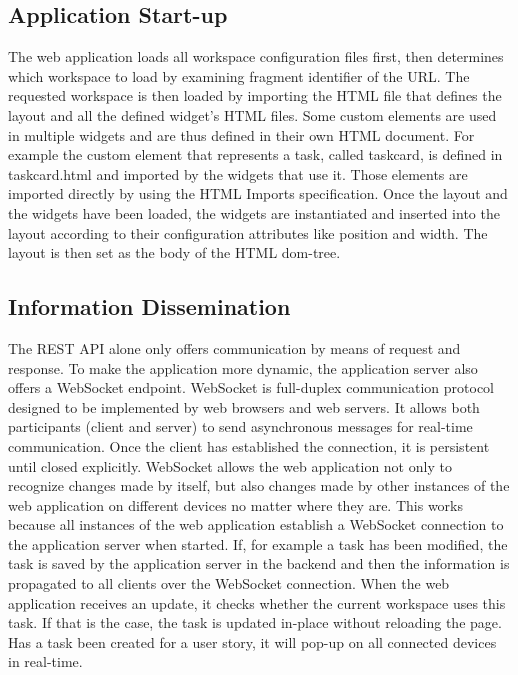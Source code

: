 \documentclass{sigchi}
\begin{document}
\subsection{Application Start-up}
The web application loads all workspace configuration files first, then determines which workspace to load by examining fragment identifier of the URL.
The requested workspace is then loaded by importing the HTML file that defines the layout and all the defined widget's HTML files.
Some custom elements are used in multiple widgets and are thus defined in their own HTML document.
For example the custom element that represents a task, called taskcard, is defined in taskcard.html and imported by the widgets that use it.
Those elements are imported directly by using the HTML Imports specification.
Once the layout and the widgets have been loaded, the widgets are instantiated and inserted into the layout according to their configuration attributes like position and width.
The layout is then set as the body of the HTML \gls{dom}-tree.

\subsection{Information Dissemination}
The REST API alone only offers communication by means of request and response.
To make the application more dynamic, the application server also offers a WebSocket \cite{websocketRFC} endpoint.
WebSocket is full-duplex communication protocol designed to be implemented by web browsers and web servers.
It allows both participants (client and server) to send asynchronous messages for real-time communication.
Once the client has established the connection, it is persistent until closed explicitly.
WebSocket allows the web application not only to recognize changes made by itself, but also changes made by other instances of the web application on different devices no matter where they are.
This works because all instances of the web application establish a WebSocket connection to the application server when started.
If, for example a task has been modified, the task is saved by the application server in the backend and then the information is propagated to all clients over the WebSocket connection.
When the web application receives an update, it checks whether the current workspace uses this task.
If that is the case, the task is updated in-place without reloading the page.
Has a task been created for a user story, it will pop-up on all connected devices in real-time.
\end{document}
